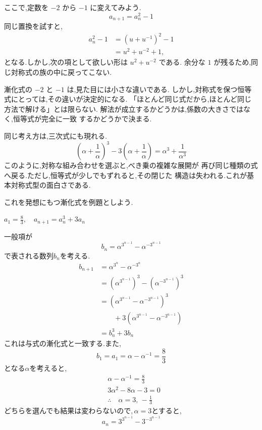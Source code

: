 ここで,定数を $-2$ から $-1$ に変えてみよう.
\[
  a_{n+1}=a_n^2-1
\]
同じ置換を試すと,
\begin{align*}
  a_n^2-1
    &=\left(u+u^{-1}\right)^2-1\\
    &=u^2+u^{-2}+1,
\end{align*}
となる.しかし,次の項として欲しい形は $u^2+u^{-2}$ である.
余分な $1$ が残るため,同じ対称式の族の中に戻ってこない.

漸化式の $-2$ と $-1$ は,見た目には小さな違いである.
しかし,対称式を保つ恒等式にとっては,その違いが決定的になる.
「ほとんど同じ式だから,ほとんど同じ方法で解ける」とは限らない.
解法が成立するかどうかは,係数の大きさではなく,恒等式が完全に一致
するかどうかで決まる.

同じ考え方は,三次式にも現れる.
\[
  \left(\alpha+\frac{1}{\alpha}\right)^3
  -3\left(\alpha+\frac{1}{\alpha}\right)
  =\alpha^3+\frac{1}{\alpha^3}
\]
このように,対称な組み合わせを選ぶと,べき乗の複雑な展開が
再び同じ種類の式へ戻る.ただし,恒等式が少しでもずれると,その閉じた
構造は失われる.これが基本対称式型の面白さである.

これを発想にもつ漸化式を例題としよう.

\noindent{}
\begin{smallquote}
  $\displaystyle a_1=\frac{8}{3},\quad a_{n+1}=a_n^3+3a_n$
\end{smallquote}
\begin{smallquote}
  一般項が
    \[
      b_n=\alpha^{3^{n-1}}-\alpha^{-3^{n-1}}
    \]
    で表される数列$b_n$を考える.
    \begin{align*}
      b_{n+1}&=\alpha^{3^{n}}-\alpha^{-3^{n}}\\
      &=\left(\alpha^{3^{n-1}}\right)^3-\left(\alpha^{-3^{n-1}}\right)^3\\
      &=\left(\alpha^{3^{n-1}}-\alpha^{-3^{n-1}}\right)^3\\
      &\qquad +3\left(\alpha^{3^{n-1}}-\alpha^{-3^{n-1}}\right)\\
      &=b_n^3+3b_n
    \end{align*}
    これは与式の漸化式と一致する.また,
    \[
      b_1=a_1=\alpha-\alpha^{-1}=\frac{8}{3}
    \]
    となる$\alpha$を考えると,
    \begin{align*}
      &\alpha-\alpha^{-1}=\frac{8}{3}\\
      &3\alpha^2-8\alpha-3=0\\
      &\therefore \quad \alpha=3,\,-\frac13
    \end{align*}
    どちらを選んでも結果は変わらないので,\,$\alpha=3$とすると,
    \[
      a_n=3^{3^{n-1}}-3^{-3^{n-1}}
    \]
\end{smallquote}
